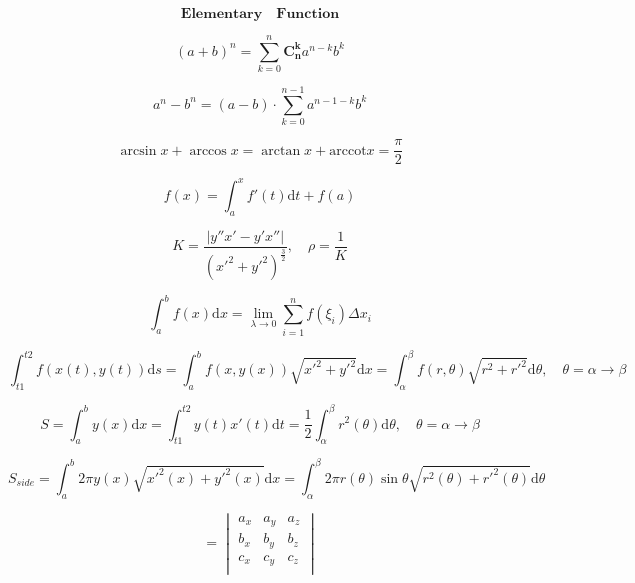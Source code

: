 \documentclass{article}
\begin{document}
    
\begin{displaymath}
    \bm{Elementary \quad Function}
\end{displaymath}

\begin{displaymath}
    (a+b)^n = \sum_{k=0}^n{\bm{C_{n}^{k}}a^{n-k}b^k}
\end{displaymath}

\begin{displaymath}
    a^{n}-b^{n} = (a-b) \cdot \sum_{k=0}^{n-1}a^{n-1-k}b^{k}
\end{displaymath}

\begin{displaymath}
    \arcsin x + \arccos x = \arctan x + \mathrm{arccot}x = \frac{\pi}{2} 
\end{displaymath}

\begin{displaymath}
    f(x) = \int_{a}^{x}f'(t) \mathrm{d}t + f(a)
\end{displaymath}

\begin{displaymath}
    K = \frac{|y''x'-y'x''|}{(x'^{2}+y'^{2})^{\frac{3}{2}}}, \quad \rho = \frac{1}{K}
\end{displaymath}

\begin{displaymath}
    \int_{a}^{b} f(x) \mathrm{d}x = \lim_{\lambda \to 0} \sum_{i=1}^{n}f(\xi_{i})\Delta x_{i}
\end{displaymath} 

\begin{displaymath}
    \int_{t1}^{t2} f(x(t),y(t)) \mathrm{d}s = \int_{a}^{b} f(x,y(x)) \sqrt{x'^2+y'^2} \mathrm{d}x = \int_{\alpha}^{\beta} f(r,\theta)\sqrt{r^2 + r'^2} \mathrm{d}\theta ,\quad \theta = \alpha \to \beta
\end{displaymath}

\begin{displaymath}
    S = \int_{a}^{b}y(x)\mathrm{d}x = \int_{t1}^{t2}y(t)x'(t)\mathrm{d}t = \frac{1}{2}\int_{\alpha}^{\beta}{r^2(\theta)}\mathrm{d}\theta ,\quad \theta = \alpha \to \beta 
\end{displaymath}

\begin{displaymath}
    S_{side} = \int_{a}^{b}2 \pi y(x)\sqrt{x'^2(x)+y'^2(x)} \mathrm{d}x = \int_{\alpha}^{\beta}{2\pi r(\theta)\sin \theta \sqrt{r^2(\theta)+r'^2(\theta)}} \mathrm{d}\theta 
\end{displaymath}

\begin{displaymath}
    [\overrightarrow{abc}]= 
    \begin{vmatrix}
        a_{x} & a_{y} & a_{z} \\
        b_{x} & b_{y} & b_{z} \\
        c_{x} & c_{y} & c_{z} \\
    \end{vmatrix}
\end{displaymath}
\end{document}
